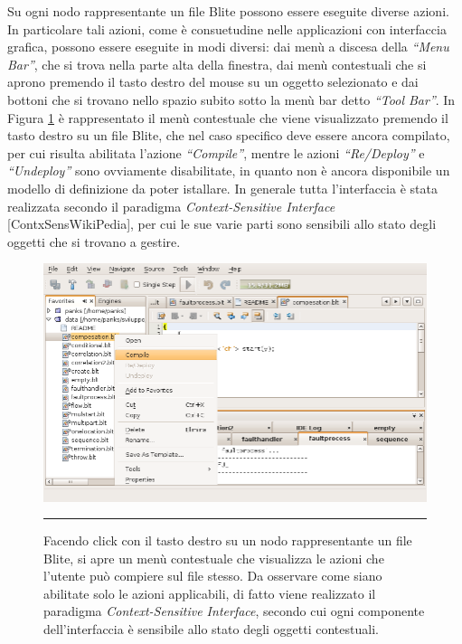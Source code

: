 Su ogni nodo rappresentante un file Blite possono essere eseguite diverse
azioni. In particolare tali azioni, come è consuetudine nelle applicazioni con
interfaccia grafica, possono essere eseguite in modi diversi: dai menù a
discesa della \emph{``Menu Bar''}, che si trova nella parte alta della finestra,
dai menù contestuali che si aprono premendo il tasto destro del mouse su
un oggetto selezionato e dai bottoni che si trovano nello spazio subito sotto
la menù bar detto \emph{``Tool Bar''}. In Figura \ref{fig:blideCMenu} è rappresentato il
menù contestuale che viene visualizzato premendo il tasto destro su un file
Blite, che nel caso specifico deve essere ancora compilato, per cui risulta
abilitata l'azione \emph{``Compile''}, mentre le azioni \emph{``Re/Deploy''} e
\emph{``Undeploy''} sono ovviamente disabilitate, in quanto non è ancora
disponibile un modello di definizione da poter istallare. In generale
tutta l'interfaccia è stata realizzata secondo il paradigma
\emph{Context-Sensitive Interface} [ContxSensWikiPedia], per cui le sue
varie parti sono sensibili allo stato degli oggetti che si trovano a gestire.

\begin{figure}[t]
\begin{center}
\includegraphics[scale=0.70]
{blide/dia/BlideCMenu}
\caption[Menu Contestuale su di un File Blite]{Facendo click con il tasto destro
su un nodo rappresentante un file Blite, si apre un menù contestuale che
visualizza le azioni che l'utente può compiere sul file stesso. Da osservare
come siano abilitate solo le azioni applicabili, di fatto viene realizzato il
paradigma \emph{Context-Sensitive Interface}, secondo cui ogni componente
dell'interfaccia è sensibile allo stato degli oggetti contestuali.}
\rule{7cm}{0.01cm}
  \label{fig:blideCMenu}
\end{center}
\end{figure}

